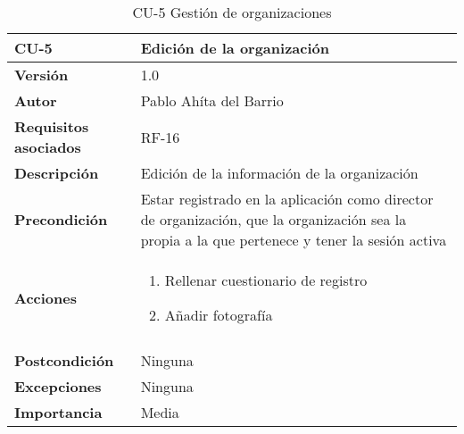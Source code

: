 \begin{table}[p]
	\centering
	\begin{tabularx}{\linewidth}{ p{} p{} }
		\toprule
		\textbf{CU-5}    & \textbf{Edición de la organización}\\
		\toprule
		\textbf{Versión}              & 1.0    \\
		\textbf{Autor}                & Pablo Ahíta del Barrio \\
		\textbf{Requisitos asociados} & RF-16\\
		\textbf{Descripción}          & Edición de la información de la organización\\
		\textbf{Precondición}         & Estar registrado en la aplicación como director de organización, que la organización sea la propia a la que pertenece y tener la sesión activa \\
		\textbf{Acciones}             &
		\begin{enumerate}
			\def\labelenumi{\arabic{enumi}.}
			\tightlist
			\item Rellenar cuestionario de registro
			\item Añadir fotografía 
		\end{enumerate}\\
		\\
		\textbf{Postcondición}        & Ninguna \\
		\textbf{Excepciones}          & Ninguna \\
		\textbf{Importancia}          & Media \\
		\bottomrule
	\end{tabularx}
	\caption{CU-5 Gestión de organizaciones}
\end{table}


